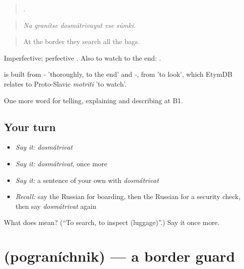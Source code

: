 \begin{quote}
    .
\end{quote}

\begin{quote}
\emph{Na granítse dosmátrivayut vse súmki.}
\end{quote}

\begin{quote}
At the border they search all the bags.
\end{quote}

Imperfective; perfective \emph{}. Also to watch to the end: \emph{ }.

\begin{cousinweb}
\emph{} is built from \emph{-} 'thoroughly, to the end' and \emph{-}, from \emph{} 'to look', which EtymDB relates to Proto-Slavic \emph{motriti} 'to watch'.
\end{cousinweb}

\begin{grammarlens}[title={What you've built}]
One more word for telling, explaining and describing at B1.
\end{grammarlens}

\subsection*{Your turn}
\begin{itemize}
\raggedright
  \item \emph{Say it:} \emph{dosmátrivat}
  \item \emph{Say it:} \emph{dosmátrivat}, once more
  \item \emph{Say it:} a sentence of your own with \emph{dosmátrivat}
  \item \emph{Recall:} say the Russian for boarding, then the Russian for a security check, then say \emph{dosmátrivat} again
\end{itemize}

\begin{tcolorbox}[breakable,colback=teal!4,colframe=teal!35!black,title={Before you move on}]
What does  mean? (\textquotedblleft{}To search, to inspect (luggage)\textquotedblright{}.) Say it once more.
\end{tcolorbox}
\section[\texorpdfstring{\ru{пограничник} (pograníchnik)}{пограничник (pograníchnik)}]{ (pograníchnik) — a border guard}

